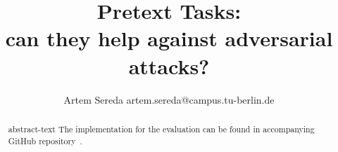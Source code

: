 \documentclass[12pt]{extarticle}
\title{
    Pretext Tasks: \\
    can they help against adversarial attacks?
}
\author{Artem Sereda artem.sereda@campus.tu-berlin.de}
\begin{document}
    \maketitle

    \begin{abstract}
    abstract-text
    The implementation for the evaluation can be found in accompanying GitHub repository~\cite{github}.
    \end{abstract}


    
    
    


    \printbibliography
\end{document}
